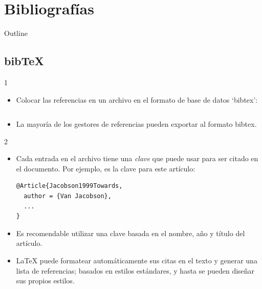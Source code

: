 \documentclass{beamer}
\begin{document}
\section{Bibliografías}

\begin{frame}{Outline}
  \begin{multicols}{2}
    \tableofcontents[currentsection]
  \end{multicols}
\end{frame}

\subsection{bib\TeX}
\begin{frame}[fragile]{\insertsubsection{} 1}
  \begin{itemize}
  \item Colocar las referencias en un archivo  en el
    formato de base de datos  `bibtex':
    \inputminted[fontsize=\scriptsize,frame=single]{latex}{bib-example.bib}
  \item La mayoría de los gestores de referencias pueden exportar al
    formato bibtex.
  \end{itemize}
\end{frame}

\begin{frame}[fragile]{\insertsubsection{} 2}
  \begin{itemize}
  \item Cada entrada en el archivo   tiene una \emph{clave}
    que puede usar para ser citado en el documento. Por ejemplo,
     es la clave para este artículo:
    \begin{verbatim}
@Article{Jacobson1999Towards,
  author = {Van Jacobson},
  ...
}
    \end{verbatim}
  \item Es recomendable utilizar una clave basada en el nombre, año y
    título del artículo.
  \item \LaTeX{} puede formatear automáticamente sus citas en el texto
    y generar una lista de referencias; basados en estilos estándares,
    y hasta se pueden diseñar sus propios estilos.
  \end{itemize}
\end{frame}
\end{document}
